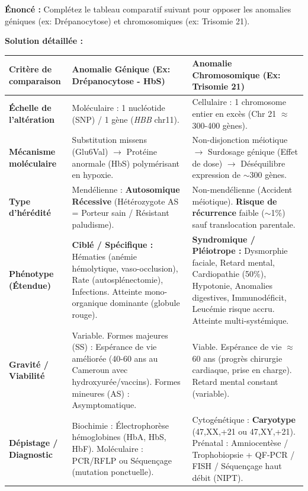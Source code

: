 \documentclass[11pt]{article}
\begin{document}
\begin{exoresolu}
    \textbf{Énoncé :} Complétez le tableau comparatif suivant pour opposer les anomalies géniques (ex: Drépanocytose) et chromosomiques (ex: Trisomie 21).

    \tcblower
    \textbf{Solution détaillée :}
    \begin{center}
    \begin{tabularx}{\linewidth}{|l|X|X|}\hline
    \rowcolor{popblueL}
    \textbf{Critère de comparaison} & \textbf{Anomalie Génique (Ex: Drépanocytose - HbS)} & \textbf{Anomalie Chromosomique (Ex: Trisomie 21)} \\ \hline
    \textbf{Échelle de l'altération} & Moléculaire : 1 nucléotide (SNP) / 1 gène (\emph{HBB} chr11). & Cellulaire : 1 chromosome entier en excès (Chr 21 $\approx$ 300-400 gènes). \\ \hline
    \textbf{Mécanisme moléculaire} & Substitution missens (Glu6Val) $\rightarrow$ Protéine anormale (HbS) polymérisant en hypoxie. & Non-disjonction méiotique $\rightarrow$ Surdosage génique (Effet de dose) $\rightarrow$ Déséquilibre expression de $\sim$300 gènes. \\ \hline
    \textbf{Type d'hérédité} & Mendélienne : \textbf{Autosomique Récessive} (Hétérozygote AS = Porteur sain / Résistant paludisme). & Non-mendélienne (Accident méiotique). \textbf{Risque de récurrence} faible ($\sim$1\%) sauf translocation parentale. \\ \hline
    \textbf{Phénotype (Étendue)} & \textbf{Ciblé / Spécifique :} Hématies (anémie hémolytique, vaso-occlusion), Rate (autosplénectomie), Infections. \newline Atteinte mono-organique dominante (globule rouge). & \textbf{Syndromique / Pléiotrope :} Dysmorphie faciale, Retard mental, Cardiopathie (50\%), Hypotonie, Anomalies digestives, Immunodéficit, Leucémie risque accru. \newline Atteinte multi-systémique. \\ \hline
    \textbf{Gravité / Viabilité} & Variable. Formes majeures (SS) : Espérance de vie améliorée (40-60 ans au Cameroun avec hydroxyurée/vaccins). Formes mineures (AS) : Asymptomatique. & Viable. Espérance de vie $\approx$ 60 ans (progrès chirurgie cardiaque, prise en charge). Retard mental constant (variable). \\ \hline
    \textbf{Dépistage / Diagnostic} & Biochimie : Électrophorèse hémoglobines (HbA, HbS, HbF). \newline Moléculaire : PCR/RFLP ou Séquençage (mutation ponctuelle). & Cytogénétique : \textbf{Caryotype} (47,XX,+21 ou 47,XY,+21). \newline Prénatal : Amniocentèse / Trophobiopsie + QF-PCR / FISH / Séquençage haut débit (NIPT). \\ \hline

\end{tabularx}
\end{center}
\end{exoresolu}
\end{document}
